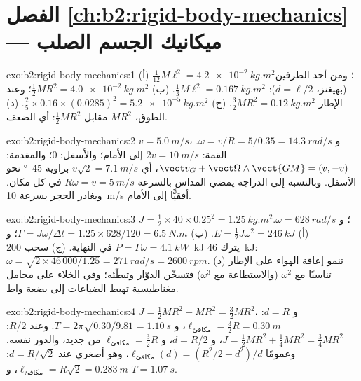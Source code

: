\section*{الفصل \ref{ch:b2:rigid-body-mechanics} --- ميكانيك الجسم الصلب}

\begin{solution}{exo:b2:rigid-body-mechanics:1}
(أ) $\tfrac1{12}M\ell^2 = \qty{4.2e-2}{kg.m^2}$؛ ومن أحد الطرفين (بهيغنز،
$d = \ell/2$): $\tfrac13M\ell^2 = \qty{0.167}{kg.m^2}$. (ب) $\tfrac12MR^2 =
\qty{4.0e-2}{kg.m^2}$؛ وعند الإطار $\tfrac32MR^2 = \qty{0.12}{kg.m^2}$.
(ج) $\tfrac25 \times 0.16 \times (0.0285)^2 = \qty{5.2e-5}{kg.m^2}$. (د) الطوق،
$MR^2$ مقابل $\tfrac12MR^2$: أي الضعف.
\end{solution}

\begin{solution}{exo:b2:rigid-body-mechanics:2}
$v = \qty{5.0}{m/s}$، و $\omega = v/R = 5/0.35 = \qty{14.3}{rad/s}$. القمة:
$2v = \qty{10}{m/s}$ إلى الأمام؛ والأسفل: $0$؛ والمقدمة: $\vect v_G + \vect\Omega
\wedge\vect{GM} = (v, -v)$، أي $v\sqrt2 = \qty{7.1}{m/s}$ بزاوية
\qty{45}{\degree} نحو الأسفل. وبالنسبة إلى الدراجة يمضي المداس بالسرعة
$R\omega = v = \qty{5}{m/s}$ في كل مكان. ويغادر الحجر بسرعة \qty{10}{m/s}
أفقيًّا إلى الأمام.
\end{solution}

\begin{solution}{exo:b2:rigid-body-mechanics:3}
$J = \tfrac12 \times 40 \times 0.25^2 = \qty{1.25}{kg.m^2}$؛ و $\omega = \qty{628}{rad/s}$.
(أ) $E = \tfrac12J\omega^2 = \qty{246}{kJ}$. (ب) $\Gamma = J\omega/\Delta t =
1.25 \times 628/120 = \qty{6.5}{N.m}$؛ و $P = \Gamma\omega = \qty{4.1}{kW}$ في النهاية.
(ج) سحب \qty{200}{kJ} يترك \qty{46}{kJ}: $\omega = \sqrt{2 \times 46\,000/1.25}
= \qty{271}{rad/s} = \qty{2600}{rpm}$. (د) تنمو إعاقة الهواء على الإطار
تناسبًا مع $\omega^2$ (والاستطاعة مع $\omega^3$) فتسخّن الدوّار وتبطّئه؛
وفي الخلاء على محامل مغناطيسية تهبط الضياعات إلى بضعة واط.
\end{solution}

\begin{solution}{exo:b2:rigid-body-mechanics:4}
$J = \tfrac12MR^2 + MR^2 = \tfrac32MR^2$، و $d = R$: $\ell_{\text{مكافئ}} = \tfrac32R
= \qty{0.30}{m}$، و $T = 2\pi\sqrt{0.30/9.81} = \qty{1.10}{s}$. وعند $R/2$: $J =
\tfrac12MR^2 + \tfrac14MR^2 = \tfrac34MR^2$، و $d = R/2$، و $\ell_{\text{مكافئ}} =
\tfrac32R$ من جديد، والدور نفسه. وعمومًا $\ell_{\text{مكافئ}}(d) = (R^2/2 +
d^2)/d$، وهو أصغري عند $d = R/\sqrt2$: $\ell_{\text{مكافئ}} = R\sqrt2 = \qty{0.283}{m}$،
و $T = \qty{1.07}{s}$.
\end{solution}

